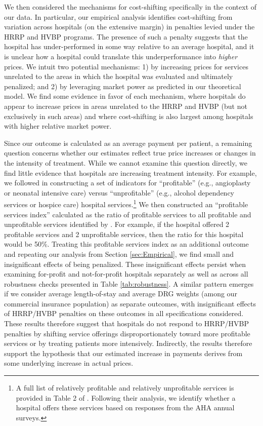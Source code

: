 \documentclass[12pt]{article}
\begin{document}
We then considered the mechanisms for cost-shifting specifically in the context of our data. In particular, our empirical analysis identifies cost-shifting from variation across hospitals (on the extensive margin) in penalties levied under the HRRP and HVBP programs. The presence of such a penalty suggests that the hospital has under-performed in some way relative to an average hospital, and it is unclear how a hospital could translate this underperformance into \textit{higher} prices. We intuit two potential mechanisms: 1) by increasing prices for services unrelated to the areas in which the hospital was evaluated and ultimately penalized; and 2) by leveraging market power as predicted in our theoretical model. We find some evidence in favor of each mechanism, where hospitals do appear to increase prices in areas unrelated to the HRRP and HVBP (but not exclusively in such areas) and where cost-shifting is also largest among hospitals with higher relative market power.

Since our outcome is calculated as an average payment per patient, a remaining question concerns whether our estimates reflect true price increases or changes in the intensity of treatment. While we cannot examine this question directly, we find little evidence that hospitals are increasing treatment intensity. For example, we followed \cite{horwitz2009} in constructing a set of indicators for ``profitable'' (e.g., angioplasty or neonatal intensive care) versus ``unprofitable'' (e.g., alcohol dependency services or hospice care) hospital services.\footnote{A full list of relatively profitable and relatively unprofitable services is provided in Table 2 of \cite{horwitz2009}. Following their analysis, we identify whether a hospital offers these services based on responses from the AHA annual surveys.} We then constructed an ``profitable services index'' calculated as the ratio of profitable services to all profitable and unprofitable services identified by \cite{horwitz2009}. For example, if the hospital offered 2 profitable services and 2 unprofitable services, then the ratio for this hospital would be 50\%. Treating this profitable services index as an additional outcome and repeating our analysis from Section \ref{sec:Empirical}, we find small and insignificant effects of being penalized. These insignificant effects persist when examining for-profit and not-for-profit hospitals separately as well as across all robustness checks presented in Table \ref{tab:robustness}. A similar pattern emerges if we consider average length-of-stay and average DRG weights (among our commercial insurance population) as separate outcomes, with insignificant effects of HRRP/HVBP penalties on these outcomes in all specifications considered. These results therefore suggest that hospitals do not respond to HRRP/HVBP penalties by shifting service offerings disproportionately toward more profitable services or by treating patients more intensively. Indirectly, the results therefore support the hypothesis that our estimated increase in payments derives from some underlying increase in actual prices.
\end{document}
